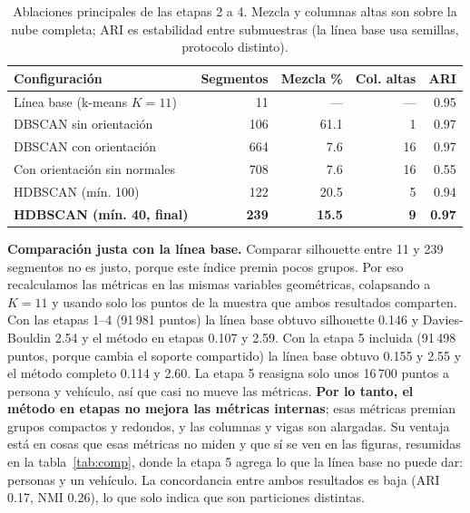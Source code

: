 \documentclass[10pt,a4paper]{article}
\begin{document}
\begin{table}[H]
\centering
\caption{Ablaciones principales de las etapas 2 a 4. Mezcla y columnas altas son sobre la nube completa; ARI es estabilidad entre submuestras (la línea base usa semillas, protocolo distinto).}
\label{tab:ablacion}
\small
\begin{tabular}{lrrrr}
\toprule
Configuración & Segmentos & Mezcla \% & Col. altas & ARI \\
\midrule
Línea base (k-means $K=11$) & 11 & --- & --- & 0.95 \\
DBSCAN sin orientación & 106 & 61.1 & 1 & 0.97 \\
DBSCAN con orientación & 664 & 7.6 & 16 & 0.97 \\
Con orientación sin normales & 708 & 7.6 & 16 & 0.55 \\
HDBSCAN (mín. 100) & 122 & 20.5 & 5 & 0.94 \\
\textbf{HDBSCAN (mín. 40, final)} & \textbf{239} & \textbf{15.5} & \textbf{9} & \textbf{0.97} \\
\bottomrule
\end{tabular}
\end{table}

\textbf{Comparación justa con la línea base.} Comparar silhouette entre 11 y 239
segmentos no es justo, porque este índice premia pocos grupos. Por eso recalculamos las
métricas en las mismas variables geométricas, colapsando a $K=11$ y usando solo los
puntos de la muestra que ambos resultados comparten. Con las etapas 1--4 (91\,981 puntos) la
línea base obtuvo silhouette 0.146 y Davies-Bouldin 2.54 y el método en etapas 0.107 y 2.59.
Con la etapa 5 incluida (91\,498 puntos, porque cambia el soporte compartido) la línea base
obtuvo 0.155 y 2.55 y el método completo 0.114 y 2.60. La etapa 5 reasigna solo unos 16\,700
puntos a persona y vehículo, así que casi no mueve las métricas. \textbf{Por lo tanto, el método en etapas no mejora
las métricas internas}; esas métricas premian grupos compactos y redondos, y las columnas y
vigas son alargadas. Su ventaja está en cosas que esas métricas no miden y que sí se ven en
las figuras, resumidas en la tabla~\ref{tab:comp}, donde la etapa 5 agrega lo que la línea
base no puede dar: personas y un vehículo. La concordancia entre ambos resultados es
baja (ARI 0.17, NMI 0.26), lo que solo indica que son particiones distintas.
\end{document}
